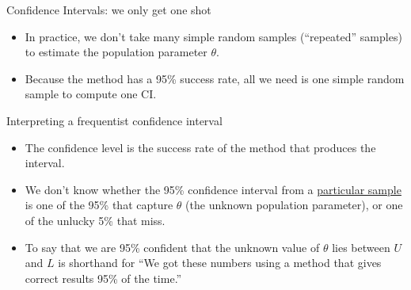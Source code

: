 \documentclass[handout]{beamer}\usepackage[]{graphicx}\usepackage[]{color}
\begin{document}





\begin{frame}{Confidence Intervals: we only get one shot}
\begin{itemize}
	\setlength\itemsep{2em}
	\item In practice, we don't take many simple random samples (``repeated'' samples) to estimate the population parameter $\theta$. \pause 
	\item Because the method has a 95\% success rate, all we need is one simple random sample to compute one CI. 
\end{itemize}
\end{frame}

\begin{frame}{Interpreting a frequentist confidence interval}
\begin{itemize}
			\setlength\itemsep{1em}
	\item The confidence level is the success rate of the method that produces the interval. \pause
	\item We don't know whether the 95\% confidence interval from a \underline{particular
	sample} is one of the 95\% that capture $\theta$ (the unknown population parameter), or one of the unlucky 5\% that miss. \pause
	\item To say that we are 95\% confident that the unknown value of $\theta$
	lies between $U$ and $L$ is shorthand for ``We got these numbers using a
	method that gives correct results 95\% of the time.''
\end{itemize}
\end{frame}
\end{document}
